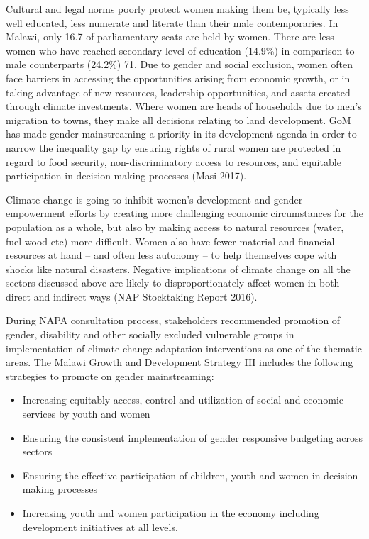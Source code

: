 \documentclass[
]{book}
\begin{document}
Cultural and legal norms poorly protect women making them be, typically less well educated, less numerate and literate than their male contemporaries. In Malawi,
only 16.7 of parliamentary seats are held by women. There are less women who have reached secondary level of education (14.9\%) in comparison to male counterparts
(24.2\%) 71. Due to gender and social exclusion, women often face barriers in accessing the opportunities arising from economic growth, or in taking advantage of
new resources, leadership opportunities, and assets created through climate investments. Where women are heads of households due to men's migration to towns,
they make all decisions relating to land development. GoM has made gender mainstreaming a priority in its development agenda in order to narrow the inequality
gap by ensuring rights of rural women are protected in regard to food security, non-discriminatory access to resources, and equitable participation in decision
making processes (Masi 2017).

Climate change is going to inhibit women's development and gender empowerment efforts by creating more challenging economic circumstances for the population as a
whole, but also by making access to natural resources (water, fuel-wood etc) more difficult. Women also have fewer material and financial resources at hand -- and
often less autonomy -- to help themselves cope with shocks like natural disasters. Negative implications of climate change on all the sectors discussed above are
likely to disproportionately affect women in both direct and indirect ways (NAP Stocktaking Report 2016).

During NAPA consultation process, stakeholders recommended promotion of gender, disability and other socially excluded vulnerable groups in implementation of
climate change adaptation interventions as one of the thematic areas. The Malawi Growth and Development Strategy III includes the following strategies to promote
on gender mainstreaming:

\begin{itemize}
\item
  Increasing equitably access, control and utilization of social and economic services by youth and women
\item
  Ensuring the consistent implementation of gender responsive budgeting across sectors
\item
  Ensuring the effective participation of children, youth and women in decision making processes
\item
  Increasing youth and women participation in the economy including development initiatives at all levels.
\end{itemize}
\end{document}
